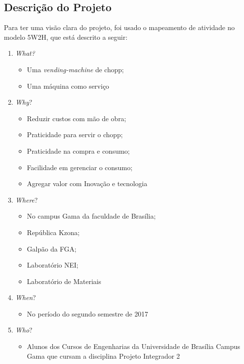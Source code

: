 		\subsection[Descrição do Projeto]{Descrição do Projeto}
			Para ter uma visão clara do projeto, foi usado o mapeamento de atividade no modelo 5W2H, que está descrito 
			a seguir:
			\begin{enumerate}
				\item \textit{What?}
					\begin{itemize}
						\item Uma \textit{vending-machine} de chopp;
						\item Uma máquina como serviço
					\end{itemize}
				\item \textit{Why}?
					\begin{itemize}
						\item Reduzir custos com mão de obra;
						\item Praticidade para servir o chopp;
						\item Praticidade na compra e consumo;
						\item Facilidade em gerenciar o consumo;
						\item Agregar valor com Inovação e tecnologia	
					\end{itemize}
				\item \textit{Where}?
					\begin{itemize}
						\item No campus Gama da faculdade de Brasília;
						\item República Kzona;
						\item Galpão da FGA;
						\item Laboratório NEI;
						\item Laboratório de Materiais
					\end{itemize}
				\item \textit{When}?
					\begin{itemize}
						\item No período do segundo semestre de 2017
					\end{itemize}
				\item \textit{Who}?
					\begin{itemize}
						\item Alunos dos Cursos de Engenharias da Universidade de Brasília Campus Gama que cursam a 	disciplina Projeto Integrador 2
					\end{itemize}
			\end{enumerate}

